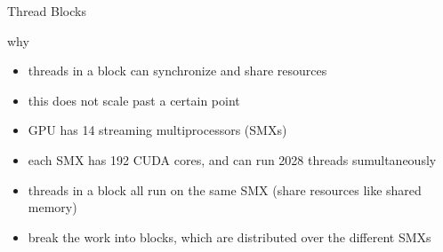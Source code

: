 \documentclass[aspectratio=43]{beamer}
\begin{document}
\begin{frame}[fragile]{Thread Blocks}
    \begin{info}{why}
        \begin{itemize}
            \item threads in a block can synchronize and share resources
            \item this does not scale past a certain point
            \item GPU has 14 streaming multiprocessors (SMXs)
            \item each SMX has 192 CUDA cores, and can run 2028 threads sumultaneously
            \item threads in a block all run on the same SMX (share resources like shared memory)
            \item break the work into blocks, which are distributed over the different SMXs
        \end{itemize}
    \end{info}
\end{frame}
\end{document}
